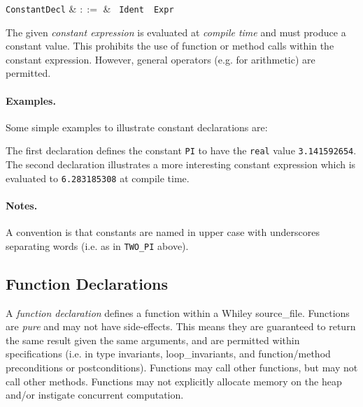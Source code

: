 \begin{syntax}
  \verb+ConstantDecl+ & $::=$ & \ \verb+Ident+\
  \ \verb+Expr+\\
\end{syntax}

The given {\em constant expression} is evaluated at {\em compile time}
and must produce a constant value.  This prohibits the use of function
or method calls within the constant expression.  However, general
operators (e.g. for arithmetic) are permitted.

\paragraph{Examples.}  Some simple examples to illustrate constant declarations are:



The first declaration defines the constant \lstinline{PI} to have the
\lstinline{real} value \lstinline{3.141592654}.  The second
declaration illustrates a more interesting constant expression which
is evaluated to \lstinline{6.283185308} at compile time.

\paragraph{Notes.}  A convention is that constants are named in upper
case with underscores separating words (i.e. as in \lstinline{TWO_PI}
above).


\subsection{Function Declarations}
\label{c_source_files_function_decl}

A {\em function declaration} defines a function within a Whiley \gls{source_file}.  Functions are {\em pure} and may not have side-effects.  This means they are guaranteed to return the same result given the same arguments, and are permitted within specifications (i.e. in type invariants, \gls{loop_invariant}s, and function/method \gls{precondition}s or \gls{postcondition}s).  Functions may call other functions, but may not call other methods.  Functions may not explicitly allocate memory on the heap and/or instigate concurrent computation.

